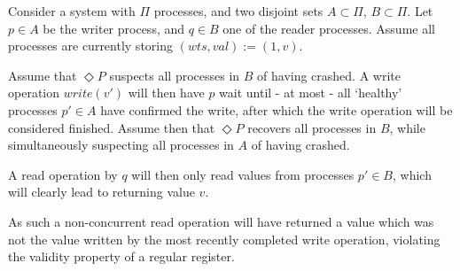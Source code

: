 \documentclass[a4paper]{scrreprt}
\begin{document}
Consider a system with $\Pi$ processes, and two disjoint sets $A \subset \Pi$,
$B \subset \Pi$. Let $p \in A$ be the writer process, and $q \in B$ one of the
reader processes. Assume all processes are currently storing $(wts, val) := (1,
v)$.

Assume that $\Diamond P$ suspects all processes in $B$ of having crashed. A
write operation $write(v')$ will then have $p$ wait until - at most - all
`healthy' processes $p' \in A$ have confirmed the write, after which the write
operation will be considered finished. Assume then that $\Diamond P$ recovers
all processes in $B$, while simultaneously suspecting all processes in $A$ of
having crashed.

A read operation by $q$ will then only read values from processes $p' \in B$,
which will clearly lead to returning value $v$.

As such a non-concurrent read operation will have returned a value which was
not the value written by the most recently completed write operation, violating
the validity property of a regular register.
\end{document}
